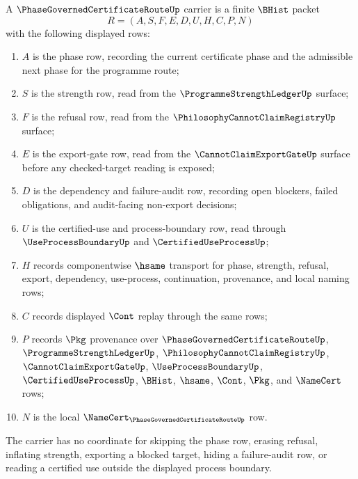 \begin{definition}
\label{def:phase-governed-certificate-route-carrier}
A $\PhaseGovernedCertificateRouteUp$ carrier is a finite $\BHist$ packet
$$
R=(A,S,F,E,D,U,H,C,P,N)
$$
with the following displayed rows:
\begin{enumerate}
\item $A$ is the phase row, recording the current certificate phase and the admissible next phase for the programme route;
\item $S$ is the strength row, read from the $\ProgrammeStrengthLedgerUp$ surface;
\item $F$ is the refusal row, read from the $\PhilosophyCannotClaimRegistryUp$ surface;
\item $E$ is the export-gate row, read from the $\CannotClaimExportGateUp$ surface before any checked-target reading is exposed;
\item $D$ is the dependency and failure-audit row, recording open blockers, failed obligations, and audit-facing non-export decisions;
\item $U$ is the certified-use and process-boundary row, read through $\UseProcessBoundaryUp$ and $\CertifiedUseProcessUp$;
\item $H$ records componentwise $\hsame$ transport for phase, strength, refusal, export, dependency, use-process, continuation, provenance, and local naming rows;
\item $C$ records displayed $\Cont$ replay through the same rows;
\item $P$ records $\Pkg$ provenance over $\PhaseGovernedCertificateRouteUp$, $\ProgrammeStrengthLedgerUp$, $\PhilosophyCannotClaimRegistryUp$, $\CannotClaimExportGateUp$, $\UseProcessBoundaryUp$, $\CertifiedUseProcessUp$, $\BHist$, $\hsame$, $\Cont$, $\Pkg$, and $\NameCert$ rows;
\item $N$ is the local $\NameCert_{\PhaseGovernedCertificateRouteUp}$ row.
\end{enumerate}
The carrier has no coordinate for skipping the phase row, erasing refusal, inflating strength, exporting a blocked target, hiding a failure-audit row, or reading a certified use outside the displayed process boundary.
\end{definition}

